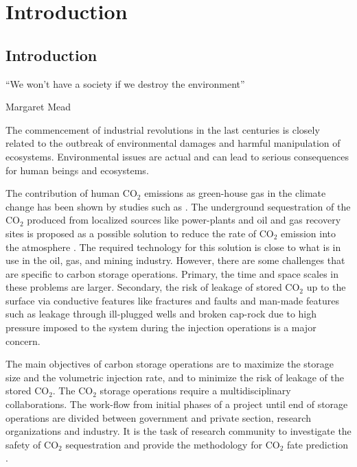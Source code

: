 \chapter{Introduction}
%



\pagebreak
\section{Introduction}
\label{sec:Introduction}
``We won’t have a society if we destroy the environment''

Margaret Mead
\vspace{2.5cm} 

The commencement of industrial revolutions in the last centuries is closely
related to the outbreak of environmental damages and harmful manipulation of
ecosystems. Environmental issues are actual and can lead to serious consequences
for human beings and ecosystems.
 
The contribution of human $\mbox{CO}_2$ emissions as green-house gas in the
climate change has been shown by studies such as \cite{houghton2001climate}. The
underground sequestration of the $\mbox{CO}_2$ produced from localized sources
like power-plants and oil and gas recovery sites is proposed as a possible
solution to reduce the rate of $\mbox{CO}_2$ emission into the atmosphere
\cite{hitchon1999sedimentary,bradshaw2001geological}. The required technology
for this solution is close to what is in use in the oil, gas, and mining
industry. However, there are some challenges that are specific to carbon storage
operations. Primary, the time and space scales in these problems are larger.
Secondary, the risk of leakage of stored $\mbox{CO}_2$ up to the surface via
conductive features like fractures and faults and man-made features such as
leakage through ill-plugged wells and broken cap-rock due to high pressure
imposed to the system during the injection operations is a major concern. 

The main objectives of carbon storage operations are to maximize the storage
size and the volumetric injection rate, and to minimize the risk of leakage of
the stored $\mbox{CO}_2$. The $\mbox{CO}_2$ storage operations require a
multidisciplinary collaborations. The work-flow from initial phases of a project
until end of storage operations are divided between government and private
section, research organizations and industry. It is the task of research
community to investigate the safety of $\mbox{CO}_2$ sequestration and provide
the methodology for $\mbox{CO}_2$ fate prediction \cite{bachu2000sequestration}.

